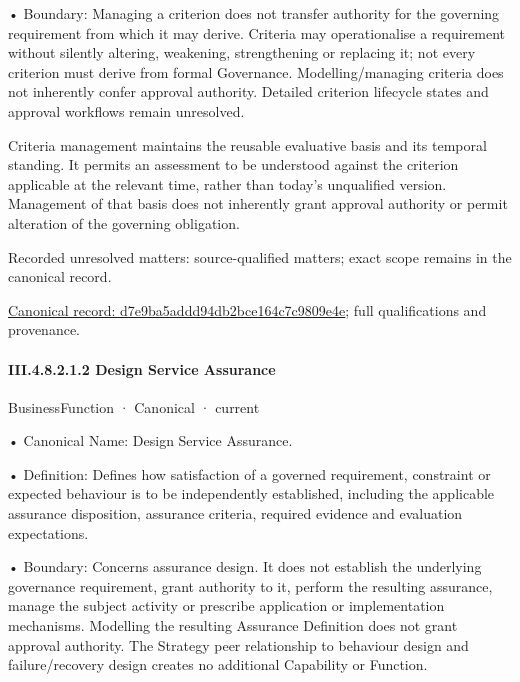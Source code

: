 •
Boundary: Managing a criterion does not transfer authority for the governing requirement from which it may derive. Criteria may operationalise a requirement without silently altering, weakening, strengthening or replacing it; not every criterion must derive from formal Governance. Modelling/managing criteria does not inherently confer approval authority. Detailed criterion lifecycle states and approval workflows remain unresolved.



Criteria management maintains the reusable evaluative basis and its temporal standing. It permits an assessment to be understood against the criterion applicable at the relevant time, rather than today's unqualified version. Management of that basis does not inherently grant approval authority or permit alteration of the governing obligation.


{\small Recorded unresolved matters: source-qualified matters; exact scope remains in the canonical record.}\par
{\footnotesize \href{../../../../../../../../continuum/business/business-function/d7e9ba5addd94db2bce164c7c9809e4e.md}{Canonical record: d7e9ba5addd94db2bce164c7c9809e4e}; full qualifications and provenance.}\par
\paragraph*{III.4.8.2.1.2 Design Service Assurance}
\label{navigation:III.4.8.2.1.2}

\label{element:6668aa8daf964fec93fce42d48b37ad1}
{\small BusinessFunction · Canonical · current}\par

•
Canonical Name: Design Service Assurance.



•
Definition: Defines how satisfaction of a governed requirement, constraint or expected behaviour is to be independently established, including the applicable assurance disposition, assurance criteria, required evidence and evaluation expectations.



•
Boundary: Concerns assurance design. It does not establish the underlying governance requirement, grant authority to it, perform the resulting assurance, manage the subject activity or prescribe application or implementation mechanisms. Modelling the resulting Assurance Definition does not grant approval authority. The Strategy peer relationship to behaviour design and failure/recovery design creates no additional Capability or Function.



